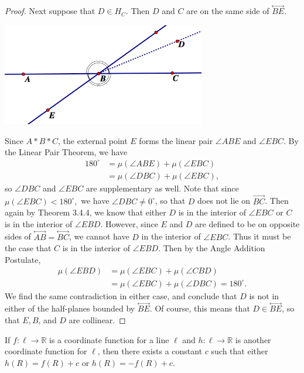 \documentclass{article}
\newenvironment{problem1}[1]{\noindent {\bf Problem #1:}}
{\medskip}
\newcommand{\real}{\mathbb{R}}
\newcommand{\ray}[1]{\overrightarrow{#1}}
\renewcommand{\line}[1]{\stackrel{\longleftrightarrow}{#1}}
\renewcommand{\deg}{^{\circ}}
\begin{document}
\begin{proof}
Next suppose that $D\in H_C$. Then $D$ and $C$ are on the same side of $\line{BE}$.
\begin{center}
\includegraphics[width=3.5in]{S3_5_6c.png}
\end{center}
Since $A*B*C$, the external point $E$ forms the linear pair $\angle{ABE}$ and $\angle{EBC}$. By the Linear Pair Theorem, we have
\begin{align*}
180\deg&=\mu(\angle{ABE} )+\mu(\angle{EBC})\\
&=\mu(\angle{DBC} )+\mu(\angle{EBC}),
\end{align*} 
 so $\angle{DBC}$ and $\angle{EBC}$ are supplementary as well. Note that since $\mu(\angle{EBC} )<180\deg,$ we have $\angle{DBC}\ne0\deg$, so that $D$ does not lie on $\ray{BC}$. Then again by Theorem 3.4.4, we know that either $D$ is in the interior of $\angle{EBC}$ or $C$ is in the interior of $\angle{EBD}$. However, since $E$ and $D$ are defined to be on opposite sides of $\line{AB}=\line{BC}$, we cannot have $D$ in the interior of $\angle{EBC}$. Thus it must be the case that $C$ is in the interior of $\angle{EBD}$. Then by the Angle Addition Postulate, \begin{align*} \mu(\angle{EBD})&=\mu(\angle{EBC})+\mu(\angle{CBD})\\
 &=\mu(\angle{EBC})+\mu(\angle{DBC})=180\deg.\end{align*}
 We find the same contradiction in either case, and conclude that $D$ is not in either of the half-planes bounded by $\line{BE}$. Of course, this means that $D\in\line{BE}$, so that $E,B$, and $D$ are collinear.
\end{proof}

\begin{problem1}{3.2.12(c)} If $f:\ell\to\real$ is a coordinate function for a line $\ell$ and $h:\ell\to\real$ is another coordinate function for $\ell$, then there exists a constant $c$ such that either $h(R)=f(R)+c$ or $h(R)=-f(R)+c.$
\end{problem1}
\end{document}

